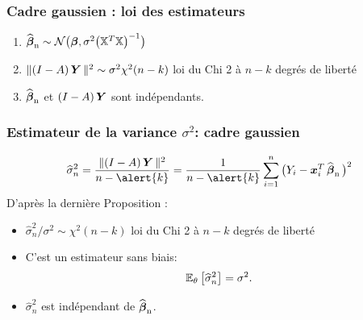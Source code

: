 \begin{frame}
\frametitle{Cadre gaussien : loi des estimateurs}
\begin{prop}
\begin{enumerate}
\item  \alert<1>{$\operatorname{\widehat{\boldsymbol{\beta}}_n} \sim {\mathcal N}\big(\boldsymbol{\beta}, \sigma^2 \big(\mathbb{X}^T\mathbb{X}\big)^{-1}\big)$}
\item  \alert<2>{$\|(I - A) \operatorname{\boldsymbol{Y}} \|^2 \sim
\sigma^2\chi^2(n-k)$ loi du Chi 2 à $n-k$ degrés de liberté}
\item  \alert<3>{$\operatorname{\widehat{\boldsymbol{\beta}}_n}$ et $(I - A) \operatorname{\boldsymbol{Y}}$ sont indépendants}.
\end{enumerate}
\end{prop}
\end{frame}




\begin{frame}
\frametitle{Estimateur de la variance $\sigma^2$: cadre gaussien}
$$
\widehat \sigma_n^2 = \frac{\| (I-\projX) \bY \|^2}{n-\alert{k}} = \frac{1}{n-\alert{k}}\sum_{i = 1}^n\big(Y_i-\bx_i^T \estregress \big)^2
$$
D'après la dernière Proposition :
\begin{itemize}
\item $\widehat
\sigma_n^2/\sigma^2 \sim \chi^2(n-k)$ \alert{ loi du Chi 2 à
$n-k$ degrés de liberté}
\item C'est un estimateur \alert{sans biais}: $$\operatorname{{\mathbb E}}_\theta\big[\widehat
\sigma_n^2\big]=\sigma^2.$$
\item $\widehat \sigma_n^2$ est \alert{indépendant} de $\operatorname{\widehat{\boldsymbol{\beta}}_n}$.
\end{itemize}
\end{frame}

